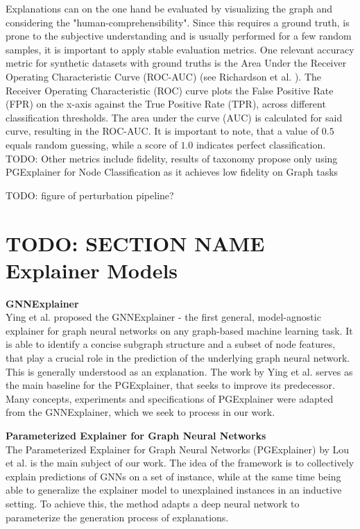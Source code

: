 Explanations can on the one hand be evaluated by visualizing the graph and considering the "human-comprehensibility". Since this requires a ground truth, is prone to the subjective understanding and is usually performed for a few random samples, it is important to apply stable evaluation metrics. One relevant accuracy metric for synthetic datasets with ground truths is the Area Under the Receiver Operating Characteristic Curve (ROC-AUC) (see Richardson et al. \cite{RICHARDSON2024100994}). The Receiver Operating Characteristic (ROC) curve plots the False Positive Rate (FPR) on the x-axis against the True Positive Rate (TPR), across different classification thresholds. The area under the curve (AUC) is calculated for said curve, resulting in the ROC-AUC. It is important to note, that a value of $0.5$ equals random guessing, while a score of $1.0$ indicates perfect classification. TODO: Other metrics include fidelity, results of taxonomy propose only using PGExplainer for Node Classification as it achieves low fidelity on Graph tasks

TODO: figure of perturbation pipeline?


\section{TODO: SECTION NAME Explainer Models}
\label{sec:Explainer_Models}

\textbf{GNNExplainer} \\
Ying et al. proposed the GNNExplainer \cite{ying2019gnnexplainer} - the first general, model-agnostic explainer for graph neural networks on any graph-based machine learning task. It is able to identify a concise subgraph structure and a subset of node features, that play a crucial role in the prediction of the underlying graph neural network. This is generally understood as an explanation. The work by Ying et al. serves as the main baseline for the PGExplainer, that seeks to improve its predecessor. Many concepts, experiments and specifications of PGExplainer were adapted from the GNNExplainer, which we seek to process in our work. \bigskip

\textbf{Parameterized Explainer for Graph Neural Networks} \\
The Parameterized Explainer for Graph Neural Networks (PGExplainer) by Lou et al. \cite{luo2020parameterized} is the main subject of our work. The idea of the framework is to collectively explain predictions of GNNs on a set of instance, while at the same time being able to generalize the explainer model to unexplained instances in an inductive setting. To achieve this, the method adapts a deep neural network to parameterize the generation process of explanations. %

